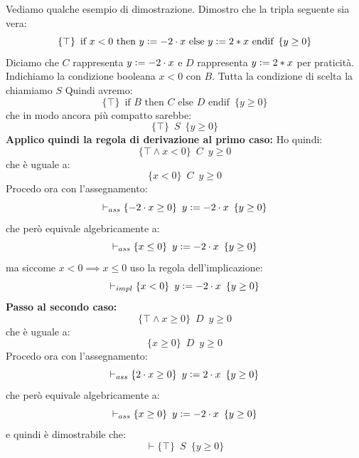 \documentclass[a4paper,12pt, oneside]{book}
\def\cceq{\mathrel{\vcenter{\hbox{:}}{=}}}
\begin{document}
\begin{esempio}
  Vediamo qualche esempio di dimostrazione. Dimostro che la tripla seguente sia
  vera:
  \[\{\top\}\,\,\,\mbox{if } x<0 \mbox{ then }y\cceq -2\cdot x \mbox{ else }
    y\cceq 2*x\mbox{ endif}\,\,\,\{y\geq 0\}\]
  Diciamo che $C$ rappresenta $y\cceq -2\cdot x$ e $D$ rappresenta $y\cceq 2*x$
  per praticità. Indichiamo la condizione booleana $x<0$ con $B$. Tutta la
  condizione di scelta la chiamiamo $S$
  Quindi avremo:
  \[\{\top\}\,\,\,\mbox{if } B \mbox{ then }C\mbox{ else }
    D \mbox{ endif}\,\,\,\{y\geq 0\}\]
  che in modo ancora più compatto sarebbe:
  \[\{\top\}\,\,\,S\,\,\,\{y\geq 0\}\]
  \textbf{Applico quindi la regola di derivazione al primo caso:}
  Ho quindi:
  \[\{\top \land x<0\}\,\,\,C\,\,\,{y\geq 0}\]
  che è uguale a:
  \[\{x<0\}\,\,\,C\,\,\,{y\geq 0}\]
  Procedo ora con l'assegnamento:
  \[\vdash_{ass}\{-2\cdot x\geq 0\}\,\,\,y\cceq -2\cdot x\,\,\,\{y\geq 0\}\]
  che però equivale algebricamente a:
  \[\vdash_{ass}\{x\leq 0\}\,\,\,y\cceq -2\cdot x\,\,\,\{y\geq 0\}\]
  ma siccome $x<0 \implies x\leq 0$ uso la regola dell'implicazione:
  \[\vdash_{impl}\{x< 0\}\,\,\,y\cceq -2\cdot x\,\,\,\{y\geq 0\}\]
  \textbf{Passo al secondo caso:}
  \[\{\top \land x\geq 0\}\,\,\,D\,\,\,{y\geq 0}\]
  che è uguale a:
  \[\{x\geq 0\}\,\,\,D\,\,\,{y\geq 0}\]
  Procedo ora con l'assegnamento:
  \[\vdash_{ass}\{2\cdot x\geq 0\}\,\,\,y\cceq 2\cdot x\,\,\,\{y\geq 0\}\]
  che però equivale algebricamente a:
  \[\vdash_{ass}\{x\geq 0\}\,\,\,y\cceq -2\cdot x\,\,\,\{y\geq 0\}\]
  e quindi è dimostrabile che:
  \[\vdash \{\top\}\,\,\,S\,\,\,\{y\geq 0\}\]
\end{esempio}
\end{document}
